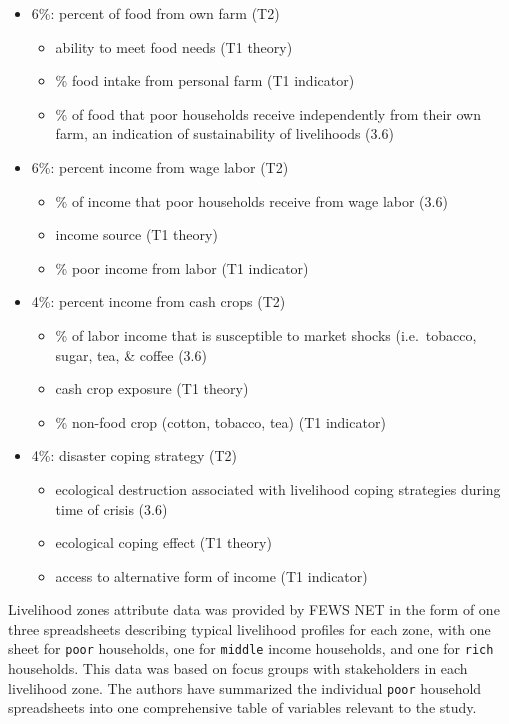 \documentclass[
]{article}
\providecommand{\tightlist}{%
  \setlength{\itemsep}{0pt}\setlength{\parskip}{0pt}}
\begin{document}
\begin{itemize}
\tightlist
\item
  6\%: percent of food from own farm (T2)

  \begin{itemize}
  \tightlist
  \item
    ability to meet food needs (T1 theory)
  \item
    \% food intake from personal farm (T1 indicator)
  \item
    \% of food that poor households receive independently from their own
    farm, an indication of sustainability of livelihoods (3.6)
  \end{itemize}
\item
  6\%: percent income from wage labor (T2)

  \begin{itemize}
  \tightlist
  \item
    \% of income that poor households receive from wage labor (3.6)
  \item
    income source (T1 theory)
  \item
    \% poor income from labor (T1 indicator)
  \end{itemize}
\item
  4\%: percent income from cash crops (T2)

  \begin{itemize}
  \tightlist
  \item
    \% of labor income that is susceptible to market shocks
    (i.e.~tobacco, sugar, tea, \& coffee (3.6)
  \item
    cash crop exposure (T1 theory)
  \item
    \% non-food crop (cotton, tobacco, tea) (T1 indicator)
  \end{itemize}
\item
  4\%: disaster coping strategy (T2)

  \begin{itemize}
  \tightlist
  \item
    ecological destruction associated with livelihood coping strategies
    during time of crisis (3.6)
  \item
    ecological coping effect (T1 theory)
  \item
    access to alternative form of income (T1 indicator)
  \end{itemize}
\end{itemize}

Livelihood zones attribute data was provided by FEWS NET in the form of
one three spreadsheets describing typical livelihood profiles for each
zone, with one sheet for \texttt{poor} households, one for
\texttt{middle} income households, and one for \texttt{rich} households.
This data was based on focus groups with stakeholders in each livelihood
zone. The authors have summarized the individual \texttt{poor} household
spreadsheets into one comprehensive table of variables relevant to the
study.
\end{document}
